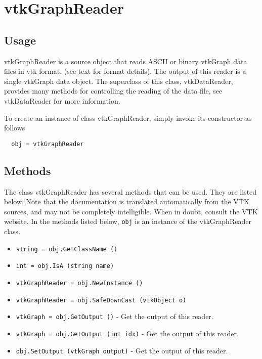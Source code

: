 \section{vtkGraphReader}

\subsection{Usage}

 vtkGraphReader is a source object that reads ASCII or binary 
 vtkGraph data files in vtk format. (see text for format details).
 The output of this reader is a single vtkGraph data object.
 The superclass of this class, vtkDataReader, provides many methods for
 controlling the reading of the data file, see vtkDataReader for more
 information.

To create an instance of class vtkGraphReader, simply
invoke its constructor as follows
\begin{verbatim}
  obj = vtkGraphReader
\end{verbatim}
\subsection{Methods}

The class vtkGraphReader has several methods that can be used.
  They are listed below.
Note that the documentation is translated automatically from the VTK sources,
and may not be completely intelligible.  When in doubt, consult the VTK website.
In the methods listed below, \verb|obj| is an instance of the vtkGraphReader class.
\begin{itemize}
\item  \verb|string = obj.GetClassName ()|

\item  \verb|int = obj.IsA (string name)|

\item  \verb|vtkGraphReader = obj.NewInstance ()|

\item  \verb|vtkGraphReader = obj.SafeDownCast (vtkObject o)|

\item  \verb|vtkGraph = obj.GetOutput ()| -  Get the output of this reader.

\item  \verb|vtkGraph = obj.GetOutput (int idx)| -  Get the output of this reader.

\item  \verb|obj.SetOutput (vtkGraph output)| -  Get the output of this reader.

\end{itemize}
